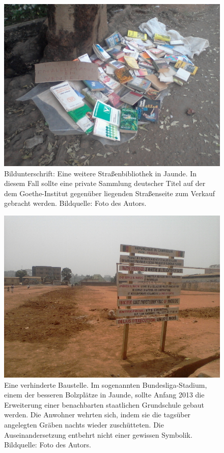 \documentclass[a4paper,
fontsize=11pt,
oneside,
numbers=noperiodatend,
parskip=half-,
bibliography=totoc,
final
]{scrartcl}
\begin{document}
\begin{figure}[htbp]
\centering
\includegraphics{img/LibrairiePoteau2.jpg}
\caption{Bildunterschrift: Eine weitere Straßenbibliothek in Jaunde. In
diesem Fall sollte eine private Sammlung deutscher Titel auf der dem
Goethe-Institut gegenüber liegenden Straßenseite zum Verkauf gebracht
werden. Bildquelle: Foto des Autors.}
\end{figure}

\begin{figure}[htbp]
\centering
\includegraphics{img/bundesliga.jpg}
\caption{Eine verhinderte Baustelle. Im sogenannten Bundesliga-Stadium,
einem der besseren Bolzplätze in Jaunde, sollte Anfang 2013 die
Erweiterung einer benachbarten staatlichen Grundschule gebaut werden.
Die Anwohner wehrten sich, indem sie die tagsüber angelegten Gräben
nachts wieder zuschütteten. Die Auseinandersetzung entbehrt nicht einer
gewissen Symbolik. Bildquelle: Foto des Autors.}
\end{figure}
\end{document}
